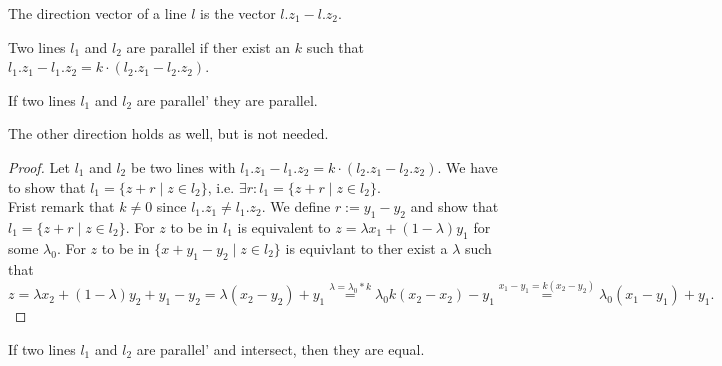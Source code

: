 \begin{definition}
    \label{def:direction_vector}
    \leanok
    The direction vector of a line $l$ is the vector $l.z_1 - l.z_2$.
\end{definition}

\begin{definition}
    \label{def:parallel'}
    \leanok
    Two lines $l_1$ and $l_2$ are parallel if ther exist an $k$ such that $l_1.z_1 - l_1.z_2 = k \cdot (l_2.z_1 - l_2.z_2)$.
\end{definition}

\begin{lemma}
    \label{lem:parallel_iff_parallel'}
    \leanok
    If two lines $l_1$ and $l_2$ are parallel' they are parallel.
\end{lemma}
\begin{remark}
    The other direction holds as well, but is not needed.
\end{remark}

\begin{proof}
    Let $l_1$ and $l_2$ be two lines with $l_1.z_1 - l_1.z_2 = k \cdot (l_2.z_1 - l_2.z_2)$.
    We have to show that $l_1 = \{z + r \mid z\in l_2\}$, i.e. $\exists r: l_1 = \{z + r \mid z\in l_2\}$.\\
    Frist remark that $k\ne 0$ since $l_1.z_1\ne l_1.z_2$. We define $r:= y_1 - y_2$ and show that $l_1 = \{z + r \mid z\in l_2\}$.
    For $z$ to be in $l_1$ is equivalent to $z = \lambda x_1 + (1-\lambda)y_1$ for some $\lambda_0$. 
    For $z$ to be in $\{x + y_1-y_2 \mid z\in l_2\}$  is equivlant to ther exist a $\lambda$ such that 
    $$z = \lambda x_2 + (1-\lambda)y_2 + y_1 - y_2 = \lambda (x_2 - y_2) + y_1 \overset{\lambda = \lambda_0 * k}{=} \lambda_0 k (x_2-x_2)-y_1\overset{x_1-y_1=k(x_2-y_2)}{=}\lambda_0(x_1-y_1)+y_1.$$
\end{proof}

\begin{lemma}
    \label{lem:eq_of_parallel}
    \leanok
    If two lines $l_1$ and $l_2$ are parallel' and intersect, then they are equal.
\end{lemma}

